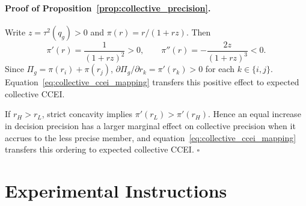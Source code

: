 \documentclass[11 pt]{article}
\begin{document}
\paragraph{Proof of Proposition~\ref{prop:collective_precision}.}
Write $z=\tau^2(q_g)>0$ and $\pi(r)=r/(1+rz)$. Then
\begin{equation}
    \pi'(r)=\frac{1}{(1+rz)^2}>0, \qquad
    \pi''(r)=-\frac{2z}{(1+rz)^3}<0.
    \label{eq:pi_concavity}
\end{equation}
Since $\Pi_g=\pi(r_i)+\pi(r_j)$, $\partial\Pi_g/\partial r_k=\pi'(r_k)>0$ for each $k\in\{i,j\}$. Equation~\eqref{eq:collective_ccei_mapping} transfers this positive effect to expected collective CCEI.

If $r_H>r_L$, strict concavity implies $\pi'(r_L)>\pi'(r_H)$. Hence an equal increase in decision precision has a larger marginal effect on collective precision when it accrues to the less precise member, and equation~\eqref{eq:collective_ccei_mapping} transfers this ordering to expected collective CCEI. \hfill$\square$



\newpage

\section{Experimental Instructions}
\label{app:experimental-instructions}

%
\end{document}
